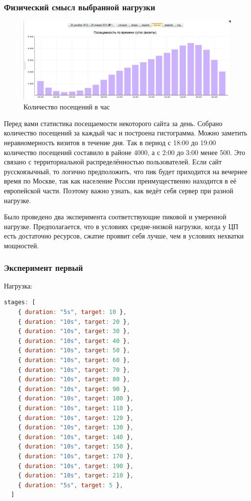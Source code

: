 \documentclass[12pt]{article}
\begin{document}
\subsubsection{ Физический смысл выбранной нагрузки }

\begin{figure}[H]
    \centering
    \includegraphics[width=1\textwidth]{../images/pedsovet.png}
    \caption{Количество посещений в час}
\end{figure}

Перед вами статистика посещаемости некоторого сайта за день. Собрано количество посещений за каждый час и построена гистограмма.
Можно заметить неравномерность визитов в течение дня. Так в период с 18:00 до 19:00 количество посещений составило в районе 4000,
а с 2:00 до 3:00 менее 500. Это связано с территориальной распределённостью пользователей.
Если сайт русскоязычный, то логично предположить, что пик будет приходится на вечернее время по Москве,
так как население России преимущественно находится в её европейской части.
Поэтому важно узнать, как ведёт себя сервер при разной нагрузке.

Было проведено два эксперимента соответствующие пиковой и умеренной нагрузке.
Предполагается, что в условиях средне-низкой нагрузки, когда у ЦП есть достаточно ресурсов,
сжатие проявит себя лучше, чем в условиях нехватки мощностей.

\subsubsection{Эксперимент первый}

Нагрузка:

\begin{lstlisting}[language=JavaScript]
  stages: [
    { duration: "5s", target: 10 },
    { duration: "10s", target: 20 },
    { duration: "10s", target: 30 },
    { duration: "10s", target: 40 },
    { duration: "10s", target: 50 },
    { duration: "10s", target: 60 },
    { duration: "10s", target: 70 },
    { duration: "10s", target: 80 },
    { duration: "10s", target: 90 },
    { duration: "10s", target: 100 },
    { duration: "10s", target: 110 },
    { duration: "10s", target: 120 },
    { duration: "10s", target: 130 },
    { duration: "10s", target: 140 },
    { duration: "10s", target: 150 },
    { duration: "10s", target: 170 },
    { duration: "10s", target: 190 },
    { duration: "10s", target: 210 },
    { duration: "5s", target: 5 },
  ]
\end{lstlisting}
\end{document}
